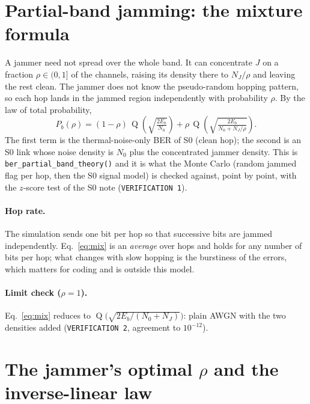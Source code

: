 \documentclass[11pt,a4paper]{article}
\newcommand{\Q}{\operatorname{Q}}
\begin{document}
\section{Partial-band jamming: the mixture formula}

A jammer need not spread over the whole band. It can concentrate $J$
on a fraction $\rho\in(0,1]$ of the channels, raising its density there to
$N_J/\rho$ and leaving the rest clean. The jammer does not know the
pseudo-random hopping pattern, so each hop lands in the jammed
region independently with probability $\rho$. By the law of total probability,
\begin{equation}
  P_b(\rho) = (1-\rho)\,\Q\!\left(\sqrt{\tfrac{2E_b}{N_0}}\right)
            + \rho\,\Q\!\left(\sqrt{\tfrac{2E_b}{N_0 + N_J/\rho}}\right).
  \label{eq:mix}
\end{equation}
The first term is the thermal-noise-only BER of S0 (clean hop); the second is an
S0 link whose noise density is $N_0$ plus the concentrated jammer density.
This is \texttt{ber\_partial\_band\_theory()} and it is what the Monte Carlo
(random jammed flag per hop, then the S0 signal model) is checked against,
point by point, with the $z$-score test of the S0 note (\texttt{VERIFICATION 1}).

\paragraph{Hop rate.}
The simulation sends one bit per hop so that successive bits are jammed
independently. Eq.~\eqref{eq:mix} is an \emph{average} over hops and holds for
any number of bits per hop; what changes with slow hopping is the burstiness
of the errors, which matters for coding and is outside this model.

\paragraph{Limit check ($\rho=1$).}
Eq.~\eqref{eq:mix} reduces to $\Q\!\big(\sqrt{2E_b/(N_0+N_J)}\big)$: plain AWGN with
the two densities added (\texttt{VERIFICATION 2}, agreement to $10^{-12}$).

\section{The jammer's optimal $\rho$ and the inverse-linear law}
\end{document}
